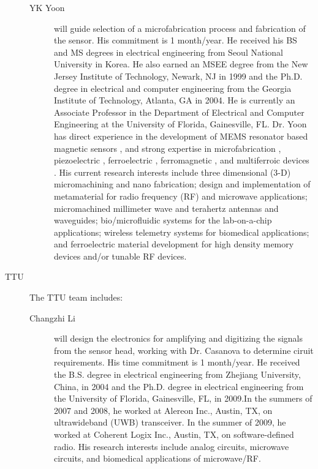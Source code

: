 \begin{description}
\begin{description}
  \item[YK Yoon] will guide selection of a microfabrication process and fabrication of the sensor. His commitment is 1 month/year. He received his BS and MS degrees in electrical engineering from Seoul National University in Korea. He also earned an MSEE degree from the New Jersey Institute of Technology, Newark, NJ in 1999 and the Ph.D. degree in electrical and computer engineering from the Georgia Institute of Technology, Atlanta, GA in 2004. He is currently an Associate Professor in the Department of Electrical and Computer Engineering at the University of Florida, Gainesville, FL. Dr. Yoon has direct experience in the development of MEMS resonator based magnetic sensors \cite{choi2006magnetically, choi2006magnetically2, choi2011nonlinear}, and strong expertise in microfabrication \cite{yoon2006multidirectional}, piezoelectric \cite{wulateral}, ferroelectric \cite{kim2014microwave,yoon2005low,yoon2003reduced}, ferromagnetic \cite{rahimi2016study,rahimi2015cylindrical,yoon2013multi}, and multiferroic devices \cite{yoon2013multi,kim2014room}. His current research interests include three dimensional (3-D) micromachining and nano fabrication; design and implementation of metamaterial for radio frequency (RF) and microwave applications; micromachined millimeter wave and terahertz antennas and waveguides; bio/microfluidic systems for the lab-on-a-chip applications; wireless telemetry systems for biomedical applications; and ferroelectric material development for high density memory devices and/or tunable RF devices.
  \end{description} 
\item[TTU] The TTU team includes:
  \begin{description}
  \item[Changzhi Li] will design the electronics for amplifying and digitizing the signals from the sensor head, working with Dr. Casanova to determine ciruit requirements. His time commitment is 1 month/year. He received the B.S. degree in electrical engineering from Zhejiang University, China, in 2004 and the Ph.D. degree in electrical engineering from the University of Florida, Gainesville, FL, in 2009.In the summers of 2007 and 2008, he worked at Alereon Inc., Austin, TX, on ultrawideband (UWB) transceiver. In the summer of 2009, he worked at Coherent Logix Inc., Austin, TX, on software-defined radio. His research interests include analog circuits, microwave circuits, and biomedical applications of microwave/RF.
  \end{description}
\end{description}


